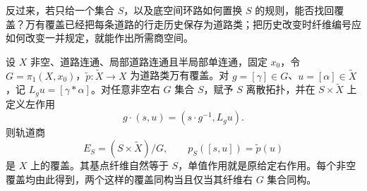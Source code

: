 反过来，若只给一个集合 \(S\)，以及底空间环路如何置换 \(S\) 的规则，能否找回覆盖？万有覆盖已经把每条道路的行走历史保存为道路类；把历史改变时纤维编号应如何改变一并规定，就能作出所需商空间。

\begin{theorem}\label{g1:thm:monodromy-reconstruction}
	设 \(X\) 非空、道路连通、局部道路连通且半局部单连通，固定 \(x_0\)，令 \(G=\pi_1(X,x_0)\)，\(\widetilde p:\widetilde X\rightarrow X\) 为道路类万有覆盖。对 \(g=[\gamma]\in G\)、\(u=[\alpha]\in\widetilde X\)，记 \(L_gu=[\gamma*\alpha]\)。对任意非空右 \(G\) 集合 \(S\)，赋予 \(S\) 离散拓扑，并在 \(S\times\widetilde X\) 上定义左作用
	\[
		g\cdot(s,u)=(s\cdot g^{-1},L_g u).
	\]
	则轨道商
	\[
		E_S=(S\times\widetilde X)/G,\qquad p_S([s,u])=\widetilde p(u)
	\]
	是 \(X\) 上的覆盖。其基点纤维自然等于 \(S\)，单值作用就是原给定右作用。每个非空覆盖均由此得到，两个这样的覆盖同构当且仅当其纤维右 \(G\) 集合同构。
\end{theorem}
